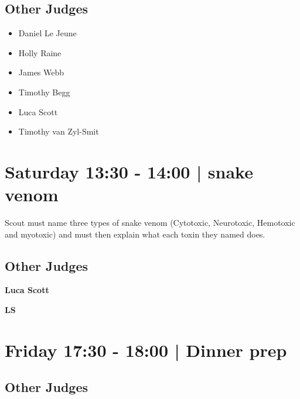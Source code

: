 \documentclass[10pt, A5]{article}
\newcommand{\newtitle}[1]{\begin{center}{\Huge\bfseries #1 }\\ \vspace{5mm}\end{center}}
\newcommand{\newsubtitle}[1]{\begin{center}{\color{grey}\Large\bfseries #1 }\\ \vspace{5mm}\end{center}}
\begin{document}
        \subsection*{Other Judges}
        
            \begin{itemize}
                            \item Daniel Le Jeune
                            \item Holly Raine
                            \item James Webb
                            \item Timothy Begg
                            \item Luca Scott
                            \item Timothy van Zyl-Smit
                        \end{itemize}
        

            \section*{Saturday 13:30
        -
        14:00
        |
         snake venom}
        
                            Scout must name three types of snake venom (Cytotoxic, Neurotoxic, Hemotoxic and myotoxic) and must then explain what each toxin they named does.
        
        \subsection*{Other Judges}
        
            \begin{itemize}
                        \end{itemize}
        

    
	\clearpage

		\newtitle{Luca Scott}
	\newsubtitle{LS}

            \section*{Friday 17:30
        -
        18:00
        |
         Dinner prep}
        
                
        \subsection*{Other Judges}
        
\end{document}
